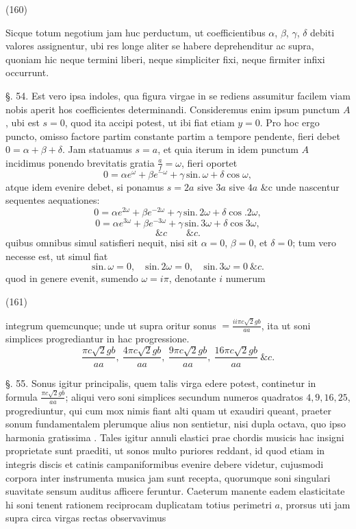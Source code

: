 \documentclass[11pt,a4paper]{article}
\begin{document}
(160)

Sicque totum negotium jam huc perductum, ut coefficientibus
$\alpha$, $\beta$, $\gamma$, $\delta$ debiti valores assignentur, ubi res longe aliter se habere
deprehenditur ac supra, quoniam hic neque termini liberi, neque
simpliciter fixi, neque firmiter infixi occurrunt.

§. 54. Est vero ipsa indoles, qua figura virgae in se
rediens assumitur facilem viam nobis aperit hos coefficientes
determinandi. Consideremus enim ipsum punctum $A$, ubi est
$s=0$, quod ita accipi potest, ut ibi fiat etiam $y=0$. Pro
hoc ergo puncto, omisso factore partim constante partim a
tempore pendente, fieri debet $0=\alpha+\beta+\delta$. Jam statuamus
$s=a$, et quia iterum in idem punctum $A$ incidimus ponendo
brevitatis gratia $\frac{a}{f}=\omega$, fieri oportet
\[ 0=\alpha e^{\omega}+\beta e^{-\omega}+\gamma\,\text{sin.}\,\omega+\delta\cos\omega, \]
atque idem evenire debet, si ponamus $s=2a$ sive $3a$
sive $4a$ \&c unde nascentur sequentes aequationes:
\[ 0=\alpha e^{2\omega}+\beta e^{-2\omega}+\gamma\,\text{sin.}\,2\omega+\delta\cos.2\omega, \]
\[ 0=\alpha e^{3\omega}+\beta e^{-3\omega}+\gamma\,\text{sin.}\,3\omega+\delta\cos 3\omega, \]
\[ \&c \qquad \&c. \]
quibus omnibus simul satisfieri nequit, nisi sit $\alpha=0$, $\beta=0$, et
$\delta=0$; tum vero necesse est, ut simul fiat
\[ \text{sin.}\,\omega=0,\quad \text{sin.}\,2\omega=0,\quad \text{sin.}\,3\omega=0 \ \&c. \]
quod in genere evenit, sumendo $\omega=i\pi$, denotante $i$ numerum

(161)

integrum quemcunque; unde ut supra oritur sonus $=\frac{ii\pi c\surd 2gb}{aa}$, ita ut soni
simplices progrediantur in hac progressione.
\[ \frac{\pi c\surd 2gb}{aa},\ \frac{4\pi c\surd 2gb}{aa},\ \frac{9\pi c\surd 2gb}{aa},\ \frac{16\pi c\surd 2gb}{aa}\ \&c. \]

§. 55. Sonus igitur principalis, quem talis virga edere potest, continetur
in formula $\frac{\pi c\surd 2gb}{aa}$; aliqui vero  soni simplices
secundum numeros quadratos $4, 9, 16, 25$, progrediuntur, qui cum mox
nimis fiant alti quam ut exaudiri queant, praeter sonum fundamentalem
plerumque alius non sentietur, nisi dupla octava, quo ipso harmonia
gratissima \struck{\ill{}} . Tales igitur annuli elastici prae chordis musicis
hac insigni proprietate sunt praediti, ut sonos multo puriores reddant,
id quod etiam in integris discis et catinis campaniformibus evenire
debere videtur, cujusmodi corpora inter instrumenta musica jam sunt
recepta, quorumque soni singulari suavitate sensum auditus
afficere feruntur. Caeterum manente eadem elasticitate hi soni
tenent rationem reciprocam duplicatam totius perimetri $a$, prorsus
uti jam supra circa virgas rectas observavimus
\end{document}
